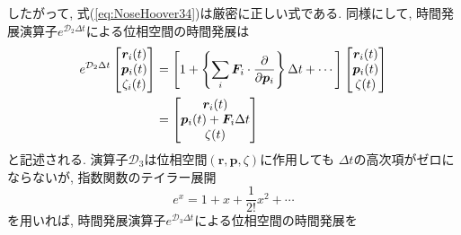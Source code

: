 したがって, 式(\ref{eq:NoseHoover34})は厳密に正しい式である.
同様にして, 時間発展演算子$e^{\mathcal{D}_{2} \Delta t}$による位相空間の時間発展は
\begin{align}
 e^{\mathcal{D}_{2} \Delta t}
 \begin{bmatrix}
  \bm{r}_{i} (t) \\
  \bm{p}_{i} (t) \\
  \zeta_{i} (t) \\
 \end{bmatrix}
 &= \left[
    1 + \left\{
    \sum_{i} \bm{F}_{i} \cdot \frac{\partial}{\partial \bm{p}_{i}}
    \right\} \Delta t
    + \cdots
 \right]
 \begin{bmatrix}
  \bm{r}_{i} (t) \\
  \bm{p}_{i} (t) \\
  \zeta (t) \\
 \end{bmatrix}
 \notag \\
 &=
 \begin{bmatrix}
  \bm{r}_{i} (t) \\
  \bm{p}_{i} (t) + \bm{F}_{i} \Delta t \\
  \zeta (t)
 \end{bmatrix}
 \label{eq:NoseHoover35}
\end{align}
と記述される. 演算子$\mathcal{D}_{3}$は位相空間$(\bm{r},\bm{p},\zeta)$に作用しても
$\Delta t$の高次項がゼロにならないが, 指数関数のテイラー展開
\begin{equation}
 e^{x} = 1 + x + \frac{1}{2!} x^{2} + \cdots
\end{equation}
を用いれば, 時間発展演算子$e^{\mathcal{D}_{3} \Delta t}$による位相空間の時間発展を
